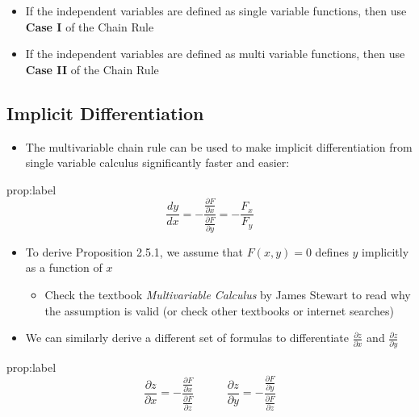 \documentclass{package/notes}
\begin{document}
\begin{itemize}
	\item If the independent variables are defined as single variable functions, then use \textbf{Case I} of the Chain Rule
	\item If the independent variables are defined as multi variable functions, then use \textbf{Case II} of the Chain Rule
\end{itemize}


\subsection{Implicit Differentiation}

\begin{itemize}
	\item The multivariable chain rule can be used to make implicit differentiation from single variable calculus significantly faster and easier:
\end{itemize}

\begin{proposition}{prop:label}
	$$\frac{dy}{dx}=-\frac{\frac{\partial F}{\partial x}}{\frac{\partial F}{\partial y}}=-\frac{F_x}{F_y}$$
\end{proposition}

\begin{itemize}
	\item To derive Proposition 2.5.1, we assume that $F(x,y) = 0$ defines $y$ implicitly as a function of $x$
	\begin{itemize}
		\item Check the textbook \textit{Multivariable Calculus} by James Stewart to read why the assumption is valid (or check other textbooks or internet searches)
	\end{itemize}
	\item We can similarly derive a different set of formulas to differentiate $\frac{\partial z}{\partial x}$ and $\frac{\partial z}{\partial y}$ 
\end{itemize}

\newpage
\begin{proposition}{prop:label}
	$$\frac{\partial z}{\partial x}=-\frac{\frac{\partial F}{\partial x}}{\frac{\partial F}{\partial z}}\:\:\:\:\:\:\:\:\:\:\:\:\:
	\frac{\partial z}{\partial y}=-\frac{\frac{\partial F}{\partial y}}{\frac{\partial F}{\partial z}}$$
\end{proposition}
\end{document}
